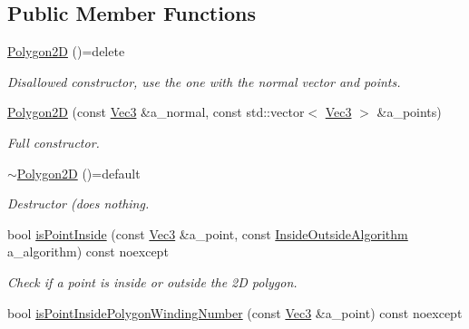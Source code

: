 \subsection*{Public Member Functions}
\begin{DoxyCompactItemize}
\item 
\mbox{\label{classDcel_1_1Polygon2D_a241e98b67756178d5b8d028b6264a6c2}} 
\hyperlink{classDcel_1_1Polygon2D_a241e98b67756178d5b8d028b6264a6c2}{Polygon2D} ()=delete
\begin{DoxyCompactList}\small\item\em Disallowed constructor, use the one with the normal vector and points. \end{DoxyCompactList}\item 
\hyperlink{classDcel_1_1Polygon2D_adcd7eb98f174260e21d0185deb44d628}{Polygon2D} (const \hyperlink{classDcel_1_1Polygon2D_a46e9686210f09464e8f5ad13300717b9}{Vec3} \&a\+\_\+normal, const std\+::vector$<$ \hyperlink{classDcel_1_1Polygon2D_a46e9686210f09464e8f5ad13300717b9}{Vec3} $>$ \&a\+\_\+points)
\begin{DoxyCompactList}\small\item\em Full constructor. \end{DoxyCompactList}\item 
\mbox{\label{classDcel_1_1Polygon2D_a0c605c847f830faf8a9f4fbc7a5c5a12}} 
\hyperlink{classDcel_1_1Polygon2D_a0c605c847f830faf8a9f4fbc7a5c5a12}{$\sim$\+Polygon2D} ()=default
\begin{DoxyCompactList}\small\item\em Destructor (does nothing. \end{DoxyCompactList}\item 
bool \hyperlink{classDcel_1_1Polygon2D_ade475a82be10cbacf382016e85316853}{is\+Point\+Inside} (const \hyperlink{classDcel_1_1Polygon2D_a46e9686210f09464e8f5ad13300717b9}{Vec3} \&a\+\_\+point, const \hyperlink{classDcel_1_1Polygon2D_a1ec8170036eb8dd1cedbe1b4d31024b4}{Inside\+Outside\+Algorithm} a\+\_\+algorithm) const noexcept
\begin{DoxyCompactList}\small\item\em Check if a point is inside or outside the 2D polygon. \end{DoxyCompactList}\item 
bool \hyperlink{classDcel_1_1Polygon2D_ad4d6b51a54f6a9c89812a5bcbc0e1902}{is\+Point\+Inside\+Polygon\+Winding\+Number} (const \hyperlink{classDcel_1_1Polygon2D_a46e9686210f09464e8f5ad13300717b9}{Vec3} \&a\+\_\+point) const noexcept

\end{DoxyCompactItemize}

